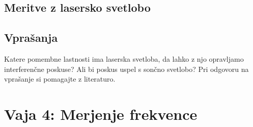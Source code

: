 \documentclass{report}
\begin{document}
\pagebreak
\section{Meritve z lasersko svetlobo}


\pagebreak

\section{Vprašanja}
Katere pomembne lastnosti ima laserska svetloba, da lahko z njo opravljamo interferenčne
poskuse? Ali bi poskus uspel s sončno svetlobo? Pri odgovoru na vprašanje si pomagajte
z literaturo.

\chapter{Vaja 4: Merjenje frekvence}
\end{document}
